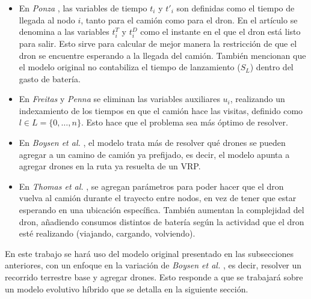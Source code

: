 \begin{itemize}
\item En \textit{Ponza} \cite{ponza2016optimization}, las variables de tiempo $t_i$ y $t'_i$ son definidas como el tiempo de llegada al nodo $i$, tanto para el camión como para el dron. En el artículo se denomina a las variables $t_i^T$ y $t_i^D$ como el instante en el que el dron está listo para salir. Esto sirve para calcular de mejor manera la restricción de que el dron se encuentre esperando a la llegada del camión. También mencionan que el modelo original no contabiliza el tiempo de lanzamiento ($S_L$) dentro del gasto de batería.
\item En \textit{Freitas} y \textit{Penna} \cite{freitas2021exact} se eliminan las variables auxiliares $u_i$, realizando un indexamiento de los tiempos en que el camión hace las visitas, definido como $l \in L = \{0,\dots,n\}$. Esto hace que el problema sea más óptimo de resolver.
\item En \textit{Boysen et al.} \cite{boysen2018drone}, el modelo trata más de resolver qué drones se pueden agregar a un camino de camión ya prefijado, es decir, el modelo apunta a agregar drones en la ruta ya resuelta de un VRP.
\item En \textit{Thomas et al.} \cite{thomas2024collaborative}, se agregan parámetros para poder hacer que el dron vuelva al camión durante el trayecto entre nodos, en vez de tener que estar esperando en una ubicación específica. También aumentan la complejidad del dron, añadiendo consumos distintos de batería según la actividad que el dron esté realizando (viajando, cargando, volviendo).
\end{itemize}


En este trabajo se hará uso del modelo original presentado en las subsecciones anteriores, con un enfoque en la variación de \textit{Boysen et al.} \cite{boysen2018drone}, es decir, resolver un recorrido terrestre base y agregar drones. Esto responde a que se trabajará sobre un modelo evolutivo híbrido que se detalla en la siguiente sección.
